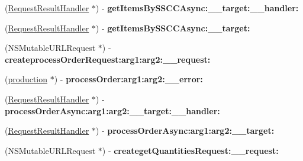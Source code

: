\begin{DoxyCompactItemize}
\item 
\hypertarget{interface_supply_chain_service_port_binding_a1d8ddcdeb3970ab026f70aa8c72f6260}{}(\hyperlink{interface_request_result_handler}{Request\+Result\+Handler} $\ast$) -\/ {\bfseries get\+Items\+By\+S\+S\+C\+C\+Async\+:\+\_\+\+\_\+target\+:\+\_\+\+\_\+handler\+:}\label{interface_supply_chain_service_port_binding_a1d8ddcdeb3970ab026f70aa8c72f6260}

\item 
\hypertarget{interface_supply_chain_service_port_binding_a3c4c4330b8d57812ced8cde2950e8c40}{}(\hyperlink{interface_request_result_handler}{Request\+Result\+Handler} $\ast$) -\/ {\bfseries get\+Items\+By\+S\+S\+C\+C\+Async\+:\+\_\+\+\_\+target\+:}\label{interface_supply_chain_service_port_binding_a3c4c4330b8d57812ced8cde2950e8c40}

\item 
\hypertarget{interface_supply_chain_service_port_binding_a911f8c66a63de4fd83fb04da2dab7cff}{}(N\+S\+Mutable\+U\+R\+L\+Request $\ast$) -\/ {\bfseries createprocess\+Order\+Request\+:arg1\+:arg2\+:\+\_\+\+\_\+request\+:}\label{interface_supply_chain_service_port_binding_a911f8c66a63de4fd83fb04da2dab7cff}

\item 
\hypertarget{interface_supply_chain_service_port_binding_a92e82faf4234356e8320b44ca99e447d}{}(\hyperlink{interfaceproduction}{production} $\ast$) -\/ {\bfseries process\+Order\+:arg1\+:arg2\+:\+\_\+\+\_\+error\+:}\label{interface_supply_chain_service_port_binding_a92e82faf4234356e8320b44ca99e447d}

\item 
\hypertarget{interface_supply_chain_service_port_binding_aac12ee5360afa48aefa7018f847c2d37}{}(\hyperlink{interface_request_result_handler}{Request\+Result\+Handler} $\ast$) -\/ {\bfseries process\+Order\+Async\+:arg1\+:arg2\+:\+\_\+\+\_\+target\+:\+\_\+\+\_\+handler\+:}\label{interface_supply_chain_service_port_binding_aac12ee5360afa48aefa7018f847c2d37}

\item 
\hypertarget{interface_supply_chain_service_port_binding_a49ce9437f8f6b19bd46e9e8f1d92893c}{}(\hyperlink{interface_request_result_handler}{Request\+Result\+Handler} $\ast$) -\/ {\bfseries process\+Order\+Async\+:arg1\+:arg2\+:\+\_\+\+\_\+target\+:}\label{interface_supply_chain_service_port_binding_a49ce9437f8f6b19bd46e9e8f1d92893c}

\item 
\hypertarget{interface_supply_chain_service_port_binding_a527d7c5005737bbd02cb354bdee8a443}{}(N\+S\+Mutable\+U\+R\+L\+Request $\ast$) -\/ {\bfseries createget\+Quantities\+Request\+:\+\_\+\+\_\+request\+:}\label{interface_supply_chain_service_port_binding_a527d7c5005737bbd02cb354bdee8a443}


\end{DoxyCompactItemize}
